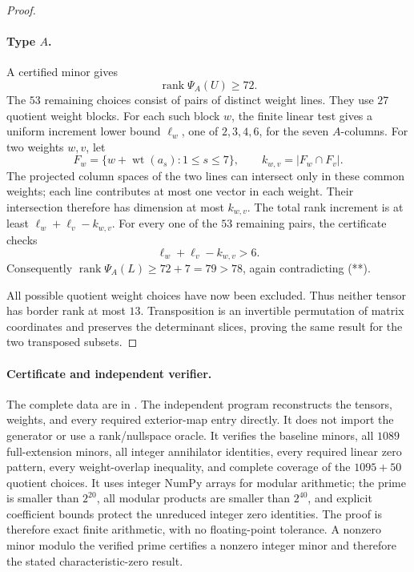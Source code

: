 \begin{proof}
\paragraph{Type \(A\).}
A certified minor gives
\[
 \operatorname{rank}\Psi_A(U)\geq72.
\]
The \(53\) remaining choices consist of pairs of distinct
weight lines. They use \(27\) quotient weight blocks.
For each such block \(w\), the finite linear test gives
a uniform increment lower bound \(\ell_w\), one of
\(2,3,4,6\), for the seven \(A\)-columns.
For two weights \(w,v\), let
\[
 F_w=\{w+\operatorname{wt}(a_s):1\leq s\leq7\},
 \qquad k_{w,v}=|F_w\cap F_v|.
\]
The projected column spaces of the two lines can intersect
only in these common weights; each line contributes at
most one vector in each weight. Their intersection
therefore has dimension at most \(k_{w,v}\).
The total rank increment is at least
\(\ell_w+\ell_v-k_{w,v}\).
For every one of the \(53\) remaining pairs, the certificate
checks
\[
 \ell_w+\ell_v-k_{w,v}>6.
\]
Consequently
\(\operatorname{rank}\Psi_A(L)\geq72+7=79>78\),
again contradicting (**).

All possible quotient weight choices have now been excluded.
Thus neither tensor has border rank at most \(13\).
Transposition is an invertible permutation of matrix
coordinates and preserves the determinant slices, proving
the same result for the two transposed subsets.
\end{proof}

\paragraph{Certificate and independent verifier.}
The complete data are in
.
The independent program
 reconstructs the
tensors, weights, and every required exterior-map entry
directly. It does not import the generator or use a
rank/nullspace oracle. It verifies the baseline minors,
all \(1089\) full-extension minors, all integer annihilator
identities, every required linear zero pattern, every
weight-overlap inequality, and complete coverage of the
\(1095+50\) quotient choices.
It uses integer NumPy arrays for modular arithmetic;
the prime is smaller than \(2^{20}\), all modular products
are smaller than \(2^{40}\), and explicit coefficient
bounds protect the unreduced integer zero identities.
The proof is therefore exact finite arithmetic, with no
floating-point tolerance. A nonzero minor modulo the
verified prime certifies a nonzero integer minor and
therefore the stated characteristic-zero result.

